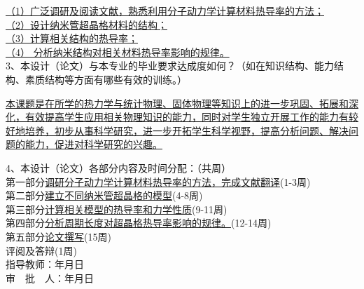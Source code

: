 \uline{（1）广泛调研及阅读文献，熟悉利用分子动力学计算材料热导率的方法；\\                    
（2）设计纳米管超晶格材料的结构；\\      
（3）计算相关结构的热导率；\\      
（4） 分析纳米结构对相关材料热导率影响的规律。}
\\3、本设计（论文）与本专业的毕业要求达成度如何？（如在知识结构、能力结构、素质结构等方面有哪些有效的训练。）

\uline{本课题是在所学的热力学与统计物理、固体物理等知识上的进一步巩固、拓展和深化，有效提高学生应用相关物理知识的能力，同时对学生独立开展工作的能力有较好地培养，初步从事科学研究，进一步开拓学生科学视野，提高分析问题、解决问题的能力，促进对科学研究的兴趣。}

\newpage

\hspace{-0.85cm}4、本设计（论文）各部分内容及时间分配：（共\underline{}周）
\\第一部分\uline{\quad 调研分子动力学计算材料热导率的方法，完成文献翻译}\hfill(1-3周) 
\\第二部分\uline{\quad 建立不同纳米管超晶格的模型}\hfill(4-8周) 
\\第三部分\uline{\quad 计算相关模型的热导率和力学性质}\hfill(9-11周)
\\第四部分\uline{\quad 分析周期长度对超晶格热导率影响的规律。}\hfill(12-14周)
\\第五部分\uline{\quad 论文撰写}\hfill(15周)
\\评阅及答辩\hfill(1周)
\vspace{16cm}
\\指导教师：\hspace{4cm}年\hspace{1cm}月\hspace{1cm}日
\\审\ \ 批\ \ 人：\hspace{4cm}年\hspace{1cm}月\hspace{1cm}日